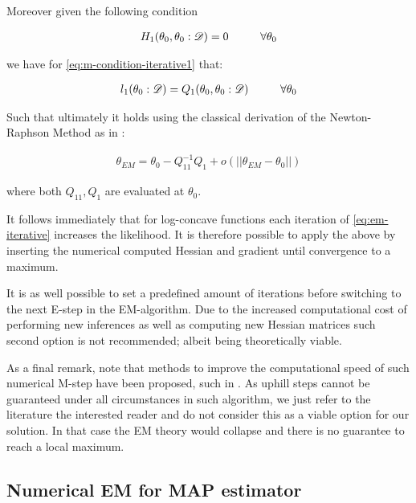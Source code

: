 \documentclass[11pt]{article}
\begin{document}
\begin{article}
Moreover given the following condition

\begin{align} 
 H_1(\theta_0, \theta_0 : \mathscr{D})  = 0 \hspace*{1cm} \forall \theta_0 \label{eq:m-condition-entropy-iterative}
\end{align}

we have for \ref{eq:m-condition-iterative1} that:

\begin{align} 
 l_1(\theta_0: \mathscr{D})  = Q_1(\theta_0, \theta_0: \mathscr{D}) \hspace*{1cm} \forall \theta_0 \label{eq:m-condition-entropy-iterative2} 
\end{align}

Such that ultimately it holds using the classical derivation of the
Newton-Raphson Method as in \cite{storvik2007numerical}:


\begin{align} 
 \theta_{EM}  = \theta_{0} - Q_{11}^{-1} Q_1 + o(||\theta_{EM} - \theta_{0}||) \label{eq:em-iterative}
\end{align}

where both \(Q_{11}, Q_{1}\) are evaluated at \(\theta_0\).

It follows immediately that for log-concave functions each iteration
of \ref{eq:em-iterative} increases the likelihood. It is therefore
possible to apply the above by inserting the numerical computed
Hessian and gradient until convergence to a maximum.

It is as well possible to set a predefined amount of iterations
before switching to the next E-step in the EM-algorithm. Due to the
increased computational cost of performing new inferences as well as
computing new Hessian matrices such second option is not
recommended; albeit being theoretically viable.

As a final remark, note that methods to improve the computational
speed of such numerical M-step have been proposed, such in
\cite{Louis_1982}. As uphill steps cannot be guaranteed under all
circumstances in such algorithm, we just refer to the literature
the interested reader and do not consider this as a viable option
for our solution. In that case the EM theory would collapse and
there is no guarantee to reach a local maximum.

\subsection{Numerical EM for MAP estimator}
\label{sec:org8ea1958}


\end{article}
\end{document}

